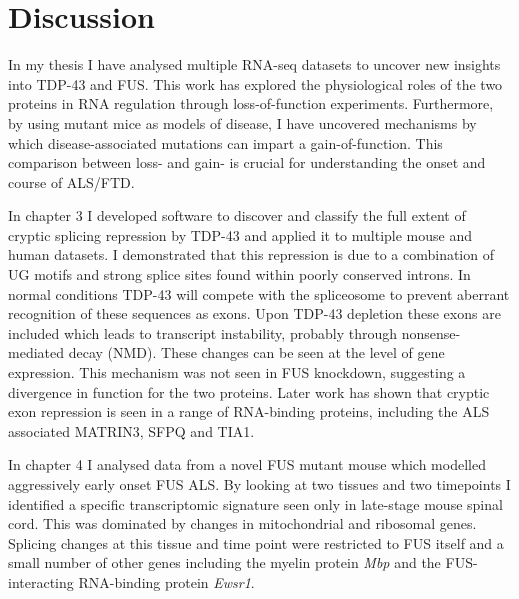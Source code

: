 \chapter{Discussion}



In my thesis I have analysed multiple RNA-seq datasets to uncover new insights into TDP-43 and FUS.
This work has explored the physiological roles of the two proteins in RNA regulation through loss-of-function experiments.
Furthermore, by using mutant mice as models of disease, I have uncovered mechanisms by which disease-associated mutations can impart a gain-of-function. 
This comparison between loss- and gain- is crucial for understanding the onset and course of ALS/FTD.

In chapter 3 I developed software to discover and classify the full extent of cryptic splicing repression by TDP-43 and applied it to multiple mouse and human datasets.
I demonstrated that this repression is due to a combination of UG motifs and strong splice sites found within poorly conserved introns.
In normal conditions TDP-43 will compete with the spliceosome to prevent aberrant recognition of these sequences as exons.
Upon TDP-43 depletion these exons are included which leads to transcript instability, probably through nonsense-mediated decay (NMD).
These changes can be seen at the level of gene expression.
This mechanism was not seen in FUS knockdown, suggesting a divergence in function for the two proteins.
Later work has shown that cryptic exon repression is seen in a range of RNA-binding proteins, including the ALS associated MATRIN3, SFPQ and TIA1.

In chapter 4 I analysed data from a novel FUS mutant mouse which modelled aggressively early onset FUS ALS. 
By looking at two tissues and two timepoints I identified a specific transcriptomic signature seen only in late-stage mouse spinal cord.
This was dominated by changes in mitochondrial and ribosomal genes.
Splicing changes at this tissue and time point were restricted to FUS itself and a small number of other genes including the myelin protein \textit{Mbp} and the FUS-interacting RNA-binding protein \textit{Ewsr1}.

